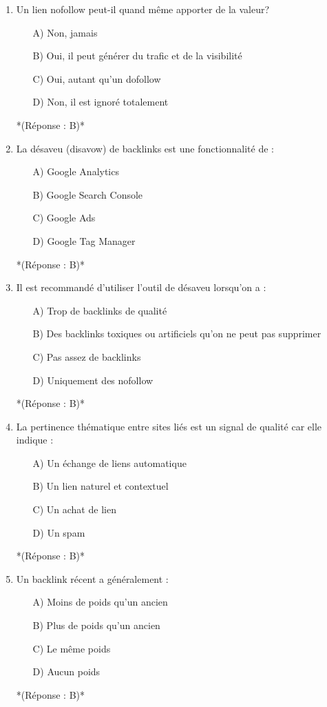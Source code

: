 \documentclass[12pt,a4paper,twoside]{report}
\begin{document}
\begin{enumerate}
\item Un lien nofollow peut-il quand même apporter de la valeur?
\begin{itemize}
\item[A)] Non, jamais
\item[B)] Oui, il peut générer du trafic et de la visibilité
\item[C)] Oui, autant qu'un dofollow
\item[D)] Non, il est ignoré totalement
\end{itemize}
*(Réponse : B)*

\item La désaveu (disavow) de backlinks est une fonctionnalité de :
\begin{itemize}
\item[A)] Google Analytics
\item[B)] Google Search Console
\item[C)] Google Ads
\item[D)] Google Tag Manager
\end{itemize}
*(Réponse : B)*

\item Il est recommandé d'utiliser l'outil de désaveu lorsqu'on a :
\begin{itemize}
\item[A)] Trop de backlinks de qualité
\item[B)] Des backlinks toxiques ou artificiels qu'on ne peut pas supprimer
\item[C)] Pas assez de backlinks
\item[D)] Uniquement des nofollow
\end{itemize}
*(Réponse : B)*

\item La pertinence thématique entre sites liés est un signal de qualité car elle indique :
\begin{itemize}
\item[A)] Un échange de liens automatique
\item[B)] Un lien naturel et contextuel
\item[C)] Un achat de lien
\item[D)] Un spam
\end{itemize}
*(Réponse : B)*

\item Un backlink récent a généralement :
\begin{itemize}
\item[A)] Moins de poids qu'un ancien
\item[B)] Plus de poids qu'un ancien
\item[C)] Le même poids
\item[D)] Aucun poids
\end{itemize}
*(Réponse : B)*


\end{enumerate}
\end{document}
